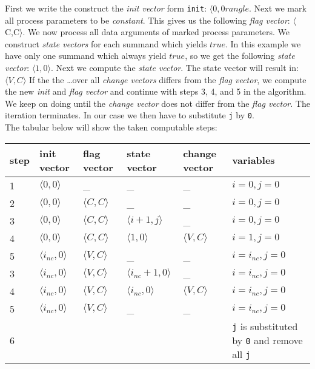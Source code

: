 \documentclass[a4paper,9pt]{article}
\begin{document}
First we write the construct the  \textit{init vector} form \verb"init": $\langle 0 ,0 rangle$. 
Next we mark all  process parameters to be \textit{constant}. This gives us the following \textit{flag vector}: $\langle$C,C$\rangle$.
We now process all data arguments of marked process parameters. 
We construct \textit{state vectors} for each summand which yields $true$. In this example we have only one summand which always yield $true$, so we get the following \textit{state vector}: $\langle 1, 0 \rangle$. Next we compute the \textit{state vector}. The state vector will result in: $\langle V, C \rangle$
If the the \ldots over all \textit{change vectors} differs from the \textit{flag vector}, we compute the new \textit{init} and \textit{flag vector} and continue with steps 3, 4, and 5 in the algorithm. We keep on doing until the \textit{change vector} does not differ from the \textit{flag vector}. The iteration terminates. In our case we then have to substitute \verb"j" by \verb"0".\\

The tabular below will show the taken computable steps: \\
\begin{tabular}{|l|l|l|l|l|l|}
\hline
step 	&  init vector 			& flag vector			& state vector 			& change vector 		& variables \\
\hline	
\hline
1 	&  $\langle 0,0 \rangle$ 	& \_				& \_				& \_				& $i=0, j=0 $ \\
\hline
2	&  $\langle 0,0 \rangle$ 	&  $\langle C,C \rangle$ 	& \_				& \_				& $i=0, j=0 $\\
\hline
3	&  $\langle 0,0 \rangle$ 	&  $\langle C,C \rangle$ 	&  $\langle i+1,j \rangle$ 	& \_				& $i=0, j=0 $\\
\hline
4	&  $\langle 0,0 \rangle$ 	&  $\langle C,C \rangle$ 	&  $\langle 1,0 \rangle$ 	&  $\langle V,C \rangle$ 	& $i=1, j=0 $\\
\hline
5	&  $\langle i_{nc},0 \rangle$ 	&  $\langle V,C \rangle$ 	&  \_				& \_ 				&  $i= i_{nc} , j=0$\\
\hline
3	&  $\langle   i_{nc} ,0 \rangle$ 	&  $\langle V,C \rangle$ 	&  $\langle   i_{nc}+1 ,0 \rangle$  			&  \_			 	& $i= i_{nc} , j=0$ \\
\hline
4	&  $\langle   i_{nc} ,0 \rangle$ 	&  $\langle V,C \rangle$ 	&  $\langle   i_{nc} ,0 \rangle$	&  $\langle V,C \rangle$  		& $i= i_{nc} , j=0 $\\
\hline
5	&  $\langle   i_{nc} ,0 \rangle$ 	&  $\langle V,C \rangle$ 	&  \_ 					& \_  					& $i= i_{nc} , j=0 $\\
\hline
6	& 					&				&					&					& \verb"j" is substituted by \verb"0" and remove all \verb"j"\\	
\hline
\end{tabular}\\
\end{document}

